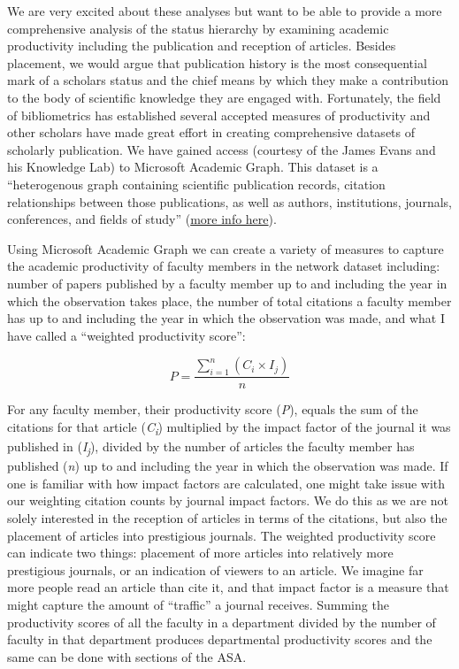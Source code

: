\documentclass{article}
\begin{document}
We are very excited about these analyses but want to be able to provide a more comprehensive analysis of the status hierarchy by examining academic productivity including the publication and reception of articles. Besides placement, we would argue that publication history is the most consequential mark of a scholars status and the chief means by which they make a contribution to the body of scientific knowledge they are engaged with. Fortunately, the field of bibliometrics has established several accepted measures of productivity and other scholars have made great effort in creating comprehensive datasets of scholarly publication. We have gained access (courtesy of the James Evans and his Knowledge Lab) to Microsoft Academic Graph. This dataset is a ``heterogenous graph containing scientific publication records, citation relationships between those publications, as well as authors, institutions, journals, conferences, and fields of study'' (\href{https://www.microsoft.com/en-us/research/project/microsoft-academic-graph/}{more info here}).

Using Microsoft Academic Graph we can create a variety of measures to capture the academic productivity of faculty members in the network dataset including: number of papers published by a faculty member up to and including the year in which the observation takes place, the number of total citations a faculty member has up to and including the year in which the observation was made, and what I have called a ``weighted productivity score'':

\begin{equation}
P = \frac{ \sum_{i=1}^{n} (C_i \times I_j) }{n}
\end{equation}

\smallskip

For any faculty member, their productivity score (\emph{P}), equals the sum of the citations for that article (\emph{C\textsubscript{i}}) multiplied by the impact factor of the journal it was published in (\emph{I\textsubscript{j}}), divided by the number of articles the faculty member has published (\emph{n}) up to and including the year in which the observation was made. If one is familiar with how impact factors are calculated, one might take issue with our weighting citation counts by journal impact factors. We do this as we are not solely interested in the reception of articles in terms of the citations, but also the placement of articles into prestigious journals. The weighted productivity score can indicate two things: placement of more articles into relatively more prestigious journals, or an indication of viewers to an article. We imagine far more people read an article than cite it, and that impact factor is a measure that might capture the amount of ``traffic'' a journal receives. Summing the productivity scores of all the faculty in a department divided by the number of faculty in that department produces departmental productivity scores and the same can be done with sections of the ASA.
\end{document}

